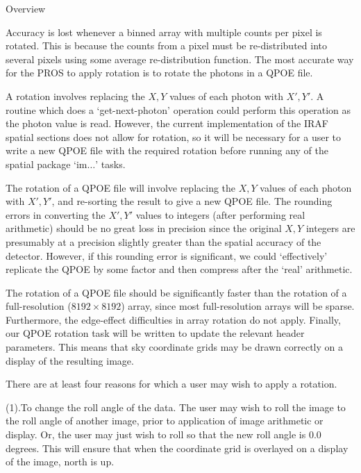 %
\def\version{Version 1.0 --- 12/22/88}
\def\chapter{Spatial --- Rotation (dmw)}
\@{Overview}

Accuracy is lost whenever a binned array with multiple counts per
pixel is rotated.  This is because the counts from a pixel must be
re-distributed into several pixels using some average re-distribution
function.  The most accurate way for the PROS to apply rotation is to rotate
the photons in a QPOE file.  

A rotation involves replacing the
$X,Y$ values of each photon with $X',Y'$.
A routine which does a `get-next-photon' operation could perform this
operation as the photon value is read.  However, the current
implementation
of the IRAF spatial sections does not allow for rotation,
so it will be necessary for a user to write a
new QPOE file with the required rotation before running any of the 
spatial package `im$\ldots$' tasks.


The rotation of a QPOE file will involve replacing the
$X,Y$ values of each photon with $X',Y'$, and re-sorting the result to
give a new QPOE file. The rounding errors in converting the $X',Y'$
values to integers (after performing real arithmetic) should be no great loss
in precision since the original $X,Y$ integers are presumably at a
precision slightly greater than the spatial accuracy of the detector.  However,
if this rounding error is significant, we could `effectively' replicate
the QPOE by some factor and then compress after the `real' arithmetic.


The rotation of a QPOE file should be significantly faster than the
rotation of a full-resolution ($8192 \times 8192$) array, since most
full-resolution arrays will be sparse.  Furthermore, the edge-effect
difficulties in array rotation do not apply.  Finally, our QPOE
rotation task will be written to update the relevant header
parameters.  This means that sky coordinate grids may be
drawn correctly on a display of the resulting image.

There are at least four reasons for which a user may wish to apply a rotation.

\item{(1).}To change the roll angle of the data.  The user may wish to roll
the image to the roll angle of another image, prior to application of
image arithmetic or display.  Or, the user may just wish to roll so
that the new roll angle is 0.0 degrees.  This will ensure that
when the coordinate grid is overlayed on a display of the image, north
is up.

